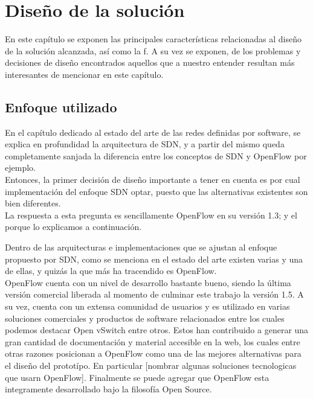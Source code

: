 \chapter{Dise\~no de la soluci\'on}

\ifpdf
    \graphicspath{{Chapter3/Figs/Raster/}{Chapter3/Figs/PDF/}{Chapter3/Figs/}}
\else
    \graphicspath{{Chapter3/Figs/Vector/}{Chapter3/Figs/}}
\fi

En este cap\'itulo se exponen las principales caracter\'isticas relacionadas al dise\~no de la soluci\'on alcanzada, as\'i como la f. A su vez se exponen, de los problemas y decisiones de dise\~no encontrados aquellos que a nuestro entender resultan m\'as interesantes de mencionar en este cap\'itulo. 
 
\section[Enfoque utilizado]{Enfoque utilizado}

En el cap\'itulo dedicado al estado del arte de las redes definidas por software, se explica en profundidad la arquitectura de SDN, y a partir del mismo queda completamente sanjada la diferencia entre los conceptos de SDN y OpenFlow por ejemplo.\\

Entonces, la primer decisi\'on de dise\~no importante a tener en cuenta es por cual implementaci\'on del enfoque SDN optar, puesto que las alternativas existentes son bien diferentes.\\
 
La respuesta a esta pregunta es sencillamente OpenFlow en su versi\'on 1.3; y el porque lo explicamos a continuaci\'on.

Dentro de las arquitecturas e implementaciones que se ajustan al enfoque propuesto por SDN, como se menciona en el estado del arte existen varias y una de ellas, y quiz\'as la que m\'as ha tracendido es OpenFlow.\\
OpenFlow cuenta con un nivel de desarrollo bastante bueno, siendo la \'ultima versi\'on comercial liberada al momento de culminar este trabajo la versi\'on 1.5.
A su vez, cuenta con un extensa comunidad de usuarios y es utilizado en varias soluciones comerciales y productos de software relacionados entre los cuales podemos destacar Open vSwitch entre otros. Estos han contribuido a generar una gran cantidad de documentaci\'on y material accesible en la web, los cuales entre otras razones posicionan a OpenFlow como una de las mejores alternativas para el dise\~no del protot\'ipo. En particular [nombrar algunas soluciones tecnologicas que usarn OpenFlow].
Finalmente se puede agregar que OpenFlow esta integramente desarrollado bajo la filosof\'ia Open Source.\\

